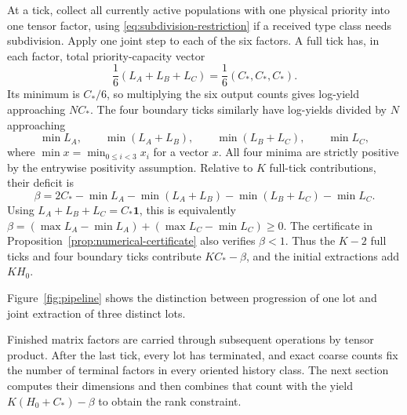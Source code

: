 At a tick, collect all currently active populations with one physical
priority into one tensor factor, using \eqref{eq:subdivision-restriction}
if a received type class needs subdivision.  Apply one joint step to
each of the six factors.  A full tick has, in each factor, total
priority-capacity vector
\[
 \frac16(L_A+L_B+L_C)=\frac16(C_*,C_*,C_*).
\]
Its minimum is $C_*/6$, so multiplying the six output counts gives
log-yield approaching $NC_*$.  The four boundary ticks similarly
have log-yields divided by $N$ approaching
\[
 \min L_A,\qquad \min(L_A+L_B),\qquad
 \min(L_B+L_C),\qquad \min L_C,
\]
where $\min x=\min_{0\leq i<3}x_i$ for a vector $x$.
All four minima are strictly positive by the entrywise positivity
assumption.  Relative to $K$ full-tick contributions, their deficit is
\begin{equation}\label{eq:boundary-deficit}
 \beta=2C_*-\min L_A-\min(L_A+L_B)
                  -\min(L_B+L_C)-\min L_C.
\end{equation}
Using $L_A+L_B+L_C=C_*\mathbf1$, this is equivalently
$\beta=(\max L_A-\min L_A)+(\max L_C-\min L_C)\geq0$.
The certificate in Proposition~\ref{prop:numerical-certificate}
also verifies $\beta<1$.
Thus the $K-2$ full ticks and four boundary ticks contribute
$KC_*-\beta$, and the initial extractions add $KH_0$.

Figure~\ref{fig:pipeline} shows the distinction between progression of
one lot and joint extraction of three distinct lots.


Finished matrix factors are carried through subsequent operations by
tensor product.  After the last tick, every lot has terminated, and
exact coarse counts fix the number of terminal factors in every oriented
history class.  The next section computes their dimensions and then
combines that count with the yield $K(H_0+C_*)-\beta$ to obtain the rank
constraint.
